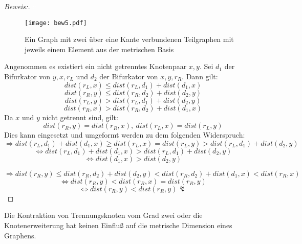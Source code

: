 \begin{proof}[Beweis:]
\textcolor{white}{x}
\begin{figure}[h!]
		\centering 		 
  \texttt{[image: bew5.pdf]}
	\caption{Ein Graph mit zwei über eine Kante verbundenen Teilgraphen mit jeweils einem Element aus der metrischen Basis}
  	 \end{figure}
  Angenommen es existiert ein nicht getrenntes Knotenpaar $x,y$. Sei $d_1$ der Bifurkator von $y,x,r_L$ und $d_2$ der Bifurkator von $x,y,r_R$. Dann gilt: $$dist(r_L,x) \leq dist(r_L,d_1)+ dist(d_1,x)$$ $$dist(r_R,y) \leq dist(r_R,d_2)+ dist(d_2,y)$$ $$dist(r_L,y) > dist(r_L,d_1)+ dist(d_2,y)$$ $$dist(r_R,x) > dist(r_R,d_2)+ dist(d_1,x)$$
  Da $x$ und $y$ nicht getrennt sind, gilt:
   $$dist(r_R,y) =dist(r_R,x),\: dist(r_L,x) = dist(r_L,y)$$ Dies kann eingesetzt und umgeformt werden zu dem folgenden Widerspruch:
  $$\Rightarrow dist(r_L,d_1)+ dist(d_1,x) \geq dist(r_L,x) = dist(r_L,y)> dist(r_L,d_1)+ dist(d_2,y)$$
  $$\Leftrightarrow dist(r_L,d_1)+ dist(d_1,x) > dist(r_L,d_1)+ dist(d_2,y)$$
  $$\Leftrightarrow dist(d_1,x) >  dist(d_2,y)$$
  
  $$\Rightarrow dist(r_R,y) \leq dist(r_R,d_2)+ dist(d_2,y) < dist(r_R,d_2) + dist(d_1,x) < dist(r_R,x)$$
  $$\Leftrightarrow dist(r_R,y) < dist(r_R,x) = dist(r_R,y)$$
  $$\Leftrightarrow dist(r_R,y) < dist(r_R,y) \lightning $$  
  
\end{proof}
\begin{lem}
\label{lem2}
Die Kontraktion von Trennungsknoten vom Grad zwei oder die Knotenerweiterung hat keinen Einfluß auf die metrische Dimension eines Graphens.
\end{lem}
